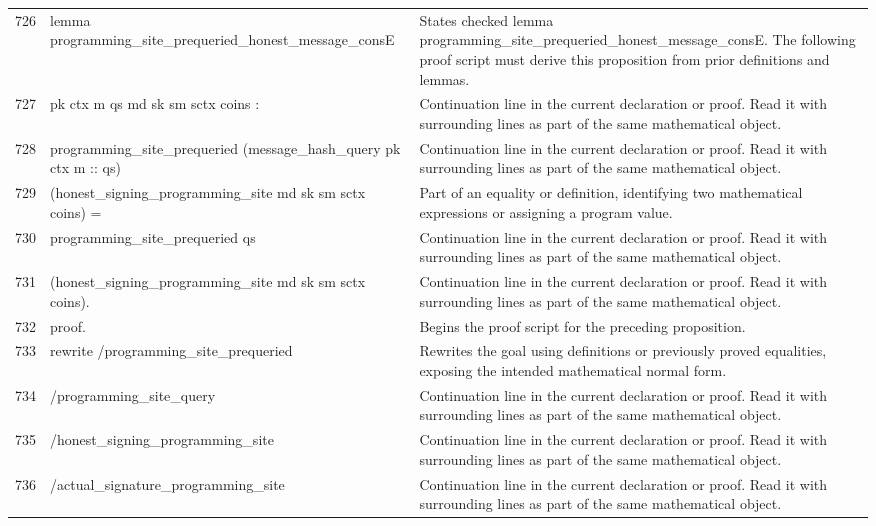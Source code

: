 \documentclass[10pt]{article}
\begin{document}
\begin{longtable}{r L{0.53\textwidth} L{0.37\textwidth}}
726 & {\ttfamily\scriptsize lemma programming\_site\_prequeried\_honest\_message\_consE} & States checked lemma programming\_site\_prequeried\_honest\_message\_consE.  The following proof script must derive this proposition from prior definitions and lemmas. \\
727 & {\ttfamily\scriptsize   pk ctx m qs md sk sm sctx coins :} & Continuation line in the current declaration or proof.  Read it with surrounding lines as part of the same mathematical object. \\
728 & {\ttfamily\scriptsize   programming\_site\_prequeried (message\_hash\_query pk ctx m :: qs)} & Continuation line in the current declaration or proof.  Read it with surrounding lines as part of the same mathematical object. \\
729 & {\ttfamily\scriptsize     (honest\_signing\_programming\_site md sk sm sctx coins) =} & Part of an equality or definition, identifying two mathematical expressions or assigning a program value. \\
730 & {\ttfamily\scriptsize   programming\_site\_prequeried qs} & Continuation line in the current declaration or proof.  Read it with surrounding lines as part of the same mathematical object. \\
731 & {\ttfamily\scriptsize     (honest\_signing\_programming\_site md sk sm sctx coins).} & Continuation line in the current declaration or proof.  Read it with surrounding lines as part of the same mathematical object. \\
732 & {\ttfamily\scriptsize proof.} & Begins the proof script for the preceding proposition. \\
733 & {\ttfamily\scriptsize rewrite /programming\_site\_prequeried} & Rewrites the goal using definitions or previously proved equalities, exposing the intended mathematical normal form. \\
734 & {\ttfamily\scriptsize         /programming\_site\_query} & Continuation line in the current declaration or proof.  Read it with surrounding lines as part of the same mathematical object. \\
735 & {\ttfamily\scriptsize         /honest\_signing\_programming\_site} & Continuation line in the current declaration or proof.  Read it with surrounding lines as part of the same mathematical object. \\
736 & {\ttfamily\scriptsize         /actual\_signature\_programming\_site} & Continuation line in the current declaration or proof.  Read it with surrounding lines as part of the same mathematical object. \\

\end{longtable}
\end{document}

